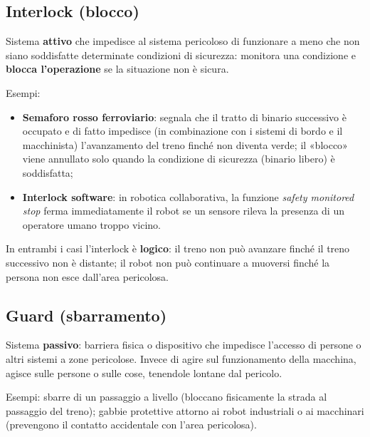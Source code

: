 \subsection{Interlock (blocco)}
\begin{defn}[Interlock]
Sistema \textbf{attivo} che impedisce al sistema pericoloso di funzionare a meno che non siano soddisfatte determinate condizioni di sicurezza: monitora una condizione e \textbf{blocca l'operazione} se la situazione non è sicura.
\end{defn}

Esempi:
\begin{itemize}
    \item \textbf{Semaforo rosso ferroviario}: segnala che il tratto di binario successivo è occupato e di fatto impedisce (in combinazione con i sistemi di bordo e il macchinista) l'avanzamento del treno finché non diventa verde; il «blocco» viene annullato solo quando la condizione di sicurezza (binario libero) è soddisfatta;
    \item \textbf{Interlock software}: in robotica collaborativa, la funzione \emph{safety monitored stop} ferma immediatamente il robot se un sensore rileva la presenza di un operatore umano troppo vicino.
\end{itemize}
In entrambi i casi l'interlock è \textbf{logico}: il treno non può avanzare finché il treno successivo non è distante; il robot non può continuare a muoversi finché la persona non esce dall'area pericolosa.

\subsection{Guard (sbarramento)}
\begin{defn}
Sistema \textbf{passivo}: barriera fisica o dispositivo che impedisce l'accesso di persone o altri sistemi a zone pericolose. Invece di agire sul funzionamento della macchina, agisce sulle persone o sulle cose, tenendole lontane dal pericolo.
\end{defn}
Esempi: sbarre di un passaggio a livello (bloccano fisicamente la strada al passaggio del treno); gabbie protettive attorno ai robot industriali o ai macchinari (prevengono il contatto accidentale con l'area pericolosa).

